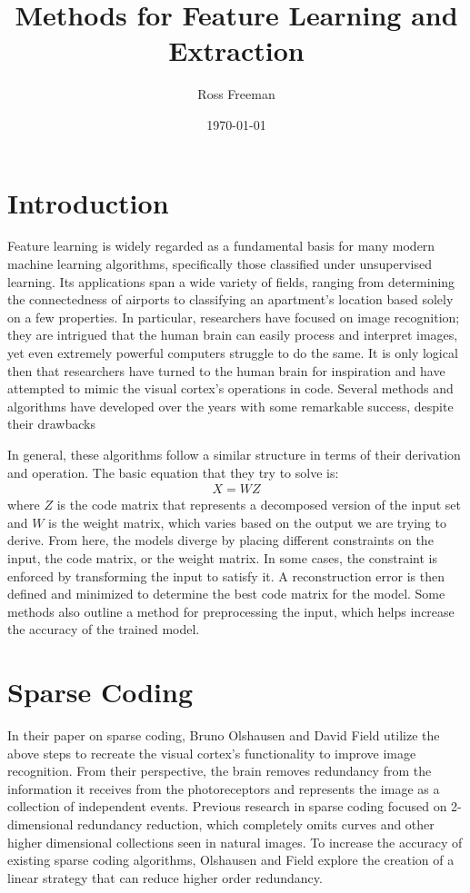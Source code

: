 \documentclass{article}
\begin{document}
\title{Methods for Feature Learning and Extraction}
\author{Ross Freeman}
\date{\today}
\maketitle
\section{Introduction}

Feature learning is widely regarded as a fundamental basis for many modern machine learning algorithms, specifically those classified under unsupervised learning. Its applications span a wide variety of fields, ranging from determining the connectedness of airports to classifying an apartment's location based solely on a few properties. In particular, researchers have focused on image recognition; they are intrigued that the human brain can easily process and interpret images, yet even extremely powerful computers struggle to do the same. It is only logical then that researchers have turned to the human brain for inspiration and have attempted to mimic the visual cortex's operations in code. Several methods and algorithms have developed over the years with some remarkable success, despite their drawbacks
	
In general, these algorithms follow a similar structure in terms of their derivation and operation. The basic equation that they try to solve is:
\begin{align*}
    X = W Z
\end{align*}
where $Z$ is the code matrix that represents a decomposed version of the input set and $W$ is the weight matrix, which varies based on the output we are trying to derive. From here, the models diverge by placing different constraints on the input, the code matrix, or the weight matrix. In some cases, the constraint is enforced by transforming the input to satisfy it. A reconstruction error is then defined and minimized to determine the best code matrix for the model. Some methods also outline a method for preprocessing the input, which helps increase the accuracy of the trained model.

\section{Sparse Coding}

In their paper on sparse coding, Bruno Olshausen and David Field utilize the above steps to recreate the visual cortex's functionality to improve image recognition. From their perspective, the brain removes redundancy from the information it receives from the photoreceptors and represents the image as a collection of independent events. Previous research in sparse coding focused on 2-dimensional redundancy reduction, which completely omits curves and other higher dimensional collections seen in natural images. To increase the accuracy of existing sparse coding algorithms, Olshausen and Field explore the creation of a linear strategy that can reduce higher order redundancy. 
\end{document}

